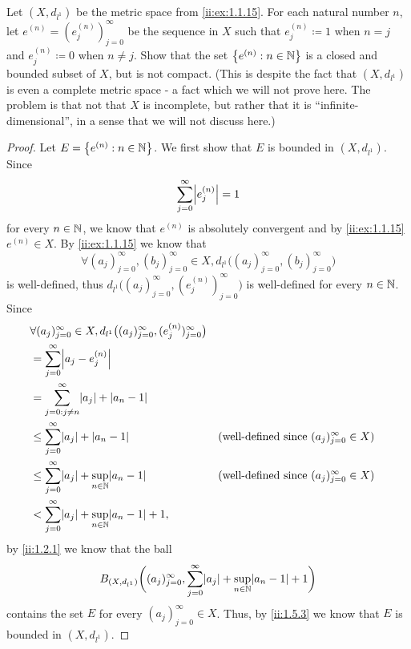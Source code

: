 \begin{ex}\label{ii:ex:1.5.8}
  Let \((X, d_{l^1})\) be the metric space from \cref{ii:ex:1.1.15}.
  For each natural number \(n\), let \(e^{(n)} = (e_j^{(n)})_{j = 0}^\infty\) be the sequence in \(X\) such that \(e_j^{(n)} \coloneqq 1\) when \(n = j\) and \(e_j^{(n)} \coloneqq 0\) when \(n \neq j\).
  Show that the set \(\left\lbrace e^{(n)} : n \in \mathbb{N}\right\rbrace\) is a closed and bounded subset of \(X\), but is not compact.
  (This is despite the fact that \((X, d_{l^1})\) is even a complete metric space
  - a fact which we will not prove here.
  The problem is that not that \(X\) is incomplete, but rather that it is ``infinite-dimensional'', in a sense that we will not discuss here.)
\end{ex}

\begin{proof}
  Let \(E = \left\lbrace e^{(n)} : n \in \mathbb{N}\right\rbrace\).
  We first show that \(E\) is bounded in \((X, d_{l^1})\).
  Since
  \[
    \sum_{j = 0}^\infty \abs{e_j^{(n)}} = 1
  \]
  for every \(n \in \mathbb{N}\), we know that \(e^{(n)}\) is absolutely convergent and by \cref{ii:ex:1.1.15} \(e^{(n)} \in X\).
  By \cref{ii:ex:1.1.15} we know that
  \[
    \forall (a_j)_{j = 0}^\infty, (b_j)_{j = 0}^\infty \in X, d_{l^1}\big((a_j)_{j = 0}^\infty, (b_j)_{j = 0}^\infty\big)
  \]
  is well-defined, thus \(d_{l^1}\big((a_j)_{j = 0}^\infty, (e_j^{(n)})_{j = 0}^\infty\big)\) is well-defined for every \(n \in \mathbb{N}\).
  Since
  \begin{align*}
     & \forall (a_j)_{j = 0}^\infty \in X, d_{l^1}\big((a_j)_{j = 0}^\infty, (e_j^{(n)})_{j = 0}^\infty\big)                                                                 \\
     & = \sum_{j = 0}^\infty \abs{a_j - e_j^{(n)}}                                                                                                                           \\
     & = \sum_{j = 0 : j \neq n}^\infty \abs{a_j} + \abs{a_n - 1}                                                                                                            \\
     & \leq \sum_{j = 0}^\infty \abs{a_j} + \abs{a_n - 1}                                                    &  & \text{(well-defined since \((a_j)_{j = 0}^\infty \in X\))} \\
     & \leq \sum_{j = 0}^\infty \abs{a_j} + \sup_{n \in \N}\abs{a_n - 1}                                     &  & \text{(well-defined since \((a_j)_{j = 0}^\infty \in X\))} \\
     & < \sum_{j = 0}^\infty \abs{a_j} + \sup_{n \in \N}\abs{a_n - 1} + 1,
  \end{align*}
  by \cref{ii:1.2.1} we know that the ball
  \[
    B_{(X, d_{l^1})}\bigg((a_j)_{j = 0}^\infty, \sum_{j = 0}^\infty \abs{a_j} + \sup_{n \in \N}\abs{a_n - 1} + 1\bigg)
  \]
  contains the set \(E\) for every \((a_j)_{j = 0}^\infty \in X\).
  Thus, by \cref{ii:1.5.3} we know that \(E\) is bounded in \((X, d_{l^1})\).


\end{proof}

